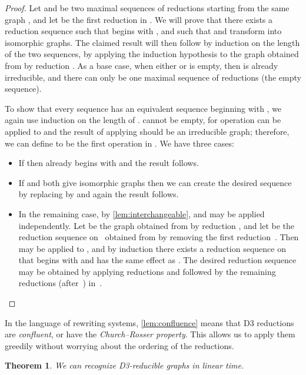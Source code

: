 \documentclass{article}
\newtheorem{theorem}{Theorem}
\begin{document}
\begin{proof}
Let  and  be two maximal sequences of reductions starting from the same graph , and let  be the first reduction in . We will prove that there exists a reduction sequence  such that  begins with , and such that  and  transform  into isomorphic graphs. The claimed result will then follow by induction on the length of the two sequences,
by applying the induction hypothesis to the graph obtained from  by reduction . As a base case, when either  or  is empty, then  is already irreducible, and there can only be one maximal sequence of reductions (the empty sequence).

To show that every sequence  has an equivalent sequence  beginning with , we again use induction on the length of .  cannot be empty, for operation  can be applied to  and the result of applying  should be an irreducible graph; therefore, we can define  to be the first operation in . We have three cases:
\begin{itemize}
\item If  then  already begins with  and the result follows.
\item If  and  both give isomorphic graphs then we can create the desired sequence  by replacing  by  and again the result follows.
\item In the remaining case, by \autoref{lem:interchangeable},  and  may be applied independently. Let  be the graph obtained from  by reduction , and let  be the reduction sequence on~ obtained from  by removing the first reduction~.
Then  may be applied to , and by induction there exists a reduction sequence  on~ that begins with  and has the same effect as . The desired reduction sequence  may be obtained by applying reductions  and  followed by the remaining reductions (after~) in~.\qedhere
\end{itemize}
\end{proof}

In the language of rewriting systems, \autoref{lem:confluence} means that D3 reductions are \emph{confluent}, or have the \emph{Church--Rosser property}. This allows us to apply them greedily without worrying about the ordering of the reductions.

\begin{theorem}
We can recognize D3-reducible graphs in linear time.
\end{theorem}
\end{document}
